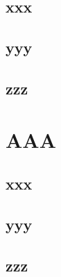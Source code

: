 \documentclass[10pt, a4paper, theme = bw]{main}
\begin{document}
\subsection{xxx}
\subsection{yyy}
\subsection{zzz}

\section{AAA}
\subsection{xxx}
\subsection{yyy}
\subsection{zzz}
\end{document}
